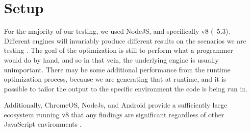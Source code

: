 \section{Setup}

For the majority of our testing, we used NodeJS, and specifically v8 (~5.3). Different engines will invariably produce different results on the scenarios we are testing \cite{engineperf16}.  The goal of the optimization is still to perform what a programmer would do by hand, and so in that vein, the underlying engine is usually unimportant.  There may be some additional performance from the runtime optimization process, because we are generating that at runtime, and it is possible to tailor the output to the specific environment the code is being run in.

Additionally, ChromeOS, NodeJs, and Android provide a sufficiently large ecosystem running v8 that any findings are significant regardless of other JavaScript environments \cite{statcounter16}.

